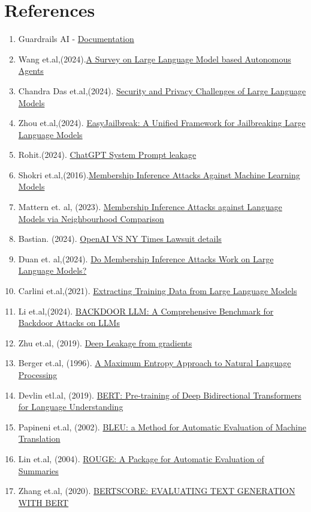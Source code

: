 \documentclass[12pt]{article}
\begin{document}
    \section*{References}
    \begin{enumerate}
        \item Guardrails AI - \href{https://www.guardrailsai.com/docs}{Documentation}
        \item Wang et.al,(2024).\href{https://arxiv.org/pdf/2308.11432}{A Survey on Large Language Model based Autonomous Agents}
        \item Chandra Das et.al,(2024). \href{https://arxiv.org/pdf/2402.00888}{Security and Privacy Challenges of Large Language Models}
        \item Zhou et.al,(2024). \href{https://arxiv.org/pdf/2403.12171}{EasyJailbreak: A Unified Framework for Jailbreaking Large Language
        Models}
        \item Rohit.(2024). \href{https://x.com/krishnanrohit/status/1755122786014724125}{ChatGPT System Prompt leakage}
        \item Shokri et.al,(2016).\href{https://arxiv.org/pdf/1610.05820}{Membership Inference Attacks Against Machine Learning Models}
        \item Mattern et. al, (2023). \href{https://arxiv.org/pdf/2305.18462}{Membership Inference Attacks against Language Models via Neighbourhood Comparison}
        \item Bastian. (2024). \href{https://the-decoder.com/openai-claims-new-york-times-prompting-strategy-violates-its-terms-of-service/}{OpenAI VS NY Times Lawsuit details}
        \item Duan et. al,(2024). \href{https://arxiv.org/pdf/2402.07841}{Do Membership Inference Attacks Work on Large Language Models?}
        \item Carlini et.al,(2021). \href{https://arxiv.org/pdf/2012.07805}{Extracting Training Data from Large Language Models}
        \item Li et.al,(2024). \href{https://arxiv.org/pdf/2408.12798}{BACKDOOR LLM: A Comprehensive Benchmark for Backdoor Attacks on LLMs}
        \item Zhu et.al, (2019). \href{https://arxiv.org/pdf/1906.08935}{Deep Leakage from gradients}
        \item Berger et.al, (1996). \href{https://aclanthology.org/J96-1002.pdf}{A Maximum Entropy Approach to Natural Language Processing}
        \item Devlin etl.al, (2019). \href{https://aclanthology.org/W04-1013.pdf}{BERT: Pre-training of Deep Bidirectional Transformers for Language Understanding}
        \item Papineni et.al, (2002). \href{https://aclanthology.org/P02-1040.pdf}{BLEU: a Method for Automatic Evaluation of Machine Translation}
        \item Lin et.al, (2004). \href{https://aclanthology.org/W04-1013.pdf}{ROUGE: A Package for Automatic Evaluation of Summaries}
        \item Zhang et.al, (2020). \href{https://arxiv.org/pdf/1904.09675}{BERTSCORE: EVALUATING TEXT GENERATION WITH BERT}
    \end{enumerate}
\end{document}
